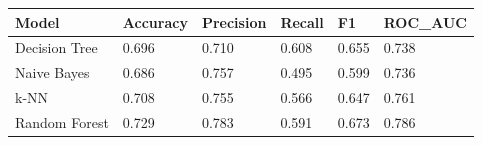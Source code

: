 \begin{tabular}{llllll}
\toprule
Model & Accuracy & Precision & Recall & F1 & ROC\_AUC \\
\midrule
Decision Tree & 0.696 & 0.710 & 0.608 & 0.655 & 0.738 \\
Naive Bayes & 0.686 & 0.757 & 0.495 & 0.599 & 0.736 \\
k-NN & 0.708 & 0.755 & 0.566 & 0.647 & 0.761 \\
Random Forest & 0.729 & 0.783 & 0.591 & 0.673 & 0.786 \\
\bottomrule
\end{tabular}
